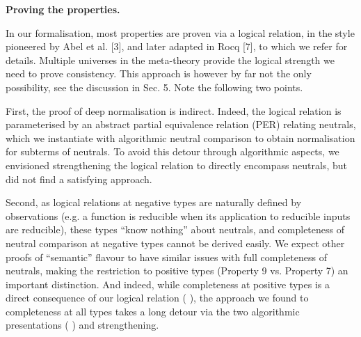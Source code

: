 
\par\medskip\noindent\textbf{Proving the properties.}\par
 
 
In our formalisation, most properties are proven via a logical relation, in the style pioneered by Abel et al. [3], and later adapted in Rocq [7], to which we refer for details. Multiple universes in the meta-theory provide the logical strength we need to prove consistency. This approach is however by far not the only possibility, see the discussion in Sec. 5. Note the following two points.\par
 
 
 
First, the proof of deep normalisation is indirect. Indeed, the logical relation is parameterised by an abstract partial equivalence relation (PER) relating neutrals, which we instantiate with algorithmic neutral comparison to obtain normalisation for subterms of neutrals. To avoid this detour through algorithmic aspects, we envisioned strengthening the logical relation to directly encompass neutrals, but did not find a satisfying approach.\par
 
 
 
Second, as logical relations at negative types are naturally defined by observations (e.g. a function is reducible when its application to reducible inputs are reducible), these types “know nothing” about neutrals, and completeness of neutral comparison at negative types cannot be derived easily. We expect other proofs of “semantic” flavour to have similar issues with full completeness of neutrals, making the restriction to positive types (Property 9 vs. Property 7) an important distinction. And indeed, while completeness at positive types is a direct consequence of our logical relation ( ), the approach we found to completeness at all types takes a long detour via the two algorithmic presentations ( ) and strengthening.\par
 
 
 
 
